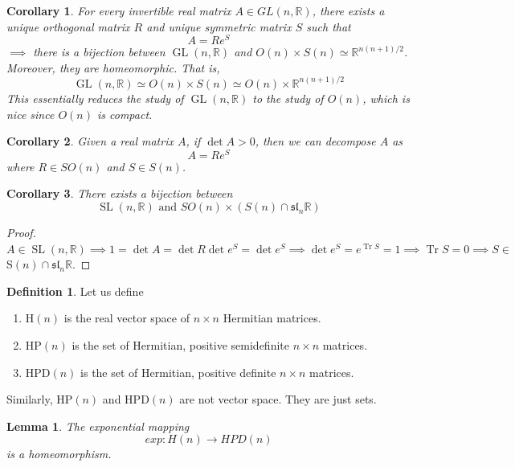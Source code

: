 \documentclass{article}
\DeclareMathOperator{\Tr}{Tr}
\DeclareMathOperator{\GL}{GL}
\DeclareMathOperator{\SL}{SL}
\newtheorem{lemma}[theorem]{Lemma}
\newtheorem{corollary}{Corollary}[theorem]
\theoremstyle{remark}
\theoremstyle{definition}
\newtheorem{definition}{Definition}[section]
\begin{document}
\begin{corollary}
For every invertible real matrix $A \in GL(n, \mathbb{R})$, there exists a unique orthogonal matrix $R$ and unique symmetric matrix $S$ such that
\[A = R e^S\]
$\implies$ there is a bijection between $\GL(n, \mathbb{R})$ and $O(n) \times S(n) \simeq \mathbb{R}^{n(n+1)/2}$. Moreover, they are homeomorphic. That is, 
\[\GL(n, \mathbb{R}) \simeq O(n) \times S(n) \simeq O(n) \times \mathbb{R}^{n(n+1)/2}\]
This essentially reduces the study of $\GL(n, \mathbb{R})$ to the study of $O(n)$, which is nice since $O(n)$ is compact. 
\end{corollary}

\begin{corollary}
Given a real matrix $A$, if $\det{A} > 0$, then we can decompose $A$ as
\[A = R e^S\]
where $R \in SO(n)$ and $S \in S(n)$. 
\end{corollary}

\begin{corollary}
There exists a bijection between
\[\SL(n, \mathbb{R}) \text{ and } SO(n) \times (S(n) \cap \mathfrak{sl}_n \mathbb{R})\]
\end{corollary}
\begin{proof}
$A \in \SL(n, \mathbb{R}) \implies 1 = \det{A} = \det{R} \det{e^S} = \det{e^S} \implies \det{e^S} = e^{\Tr{S}} = 1 \implies \Tr{S} = 0 \implies S \in$ S$(n) \cap \mathfrak{sl}_n \mathbb{R}$. 
\end{proof}

\begin{definition}
Let us define
\begin{enumerate}
    \item H$(n)$ is the real vector space of $n \times n$ Hermitian matrices. 
    \item HP$(n)$ is the set of Hermitian, positive semidefinite $n \times n$ matrices. 
    \item HPD$(n)$ is the set of Hermitian, positive definite $n \times n$ matrices. 
\end{enumerate}
Similarly, HP$(n)$ and HPD$(n)$ are not vector space. They are just sets. 
\end{definition}

\begin{lemma}
The exponential mapping
\[exp: H(n) \longrightarrow HPD(n)\]
is a homeomorphism. 
\end{lemma}
\end{document}
